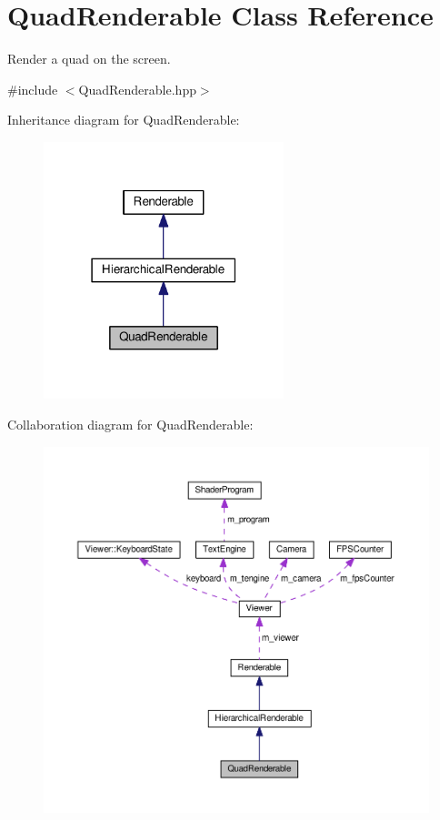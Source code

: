 \hypertarget{classQuadRenderable}{\section{Quad\+Renderable Class Reference}
\label{classQuadRenderable}
}


Render a quad on the screen.  




{\ttfamily \#include $<$Quad\+Renderable.\+hpp$>$}



Inheritance diagram for Quad\+Renderable\+:\nopagebreak
\begin{figure}[H]
\begin{center}
\leavevmode
\includegraphics[width=198pt]{classQuadRenderable__inherit__graph}
\end{center}
\end{figure}


Collaboration diagram for Quad\+Renderable\+:\nopagebreak
\begin{figure}[H]
\begin{center}
\leavevmode
\includegraphics[width=350pt]{classQuadRenderable__coll__graph}
\end{center}
\end{figure}
